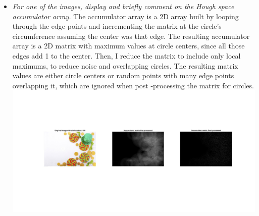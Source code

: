 \documentclass[11pt]{article}
\begin{document}
\begin{itemize}
        \item \textit{For one of the images, display and briefly comment on the Hough space accumulator array.}\newline
        The accumulator array is a 2D array built by looping through the edge points and incrementing the matrix at
        the circle's circumference assuming the center was that edge. The resulting accumulator array is a 2D matrix
        with maximum values at circle centers, since all those edges add 1 to the center. Then, I reduce the matrix
        to include only local maximums, to reduce noise and overlapping circles. The resulting matrix values are
        either circle centers or random points with many edge points overlapping it, which are ignored when post
        -processing the matrix for circles.\newline
        \includegraphics[width=\textwidth]{Output Pictures/hough_accumulator}\newline


\end{itemize}
\end{document}
